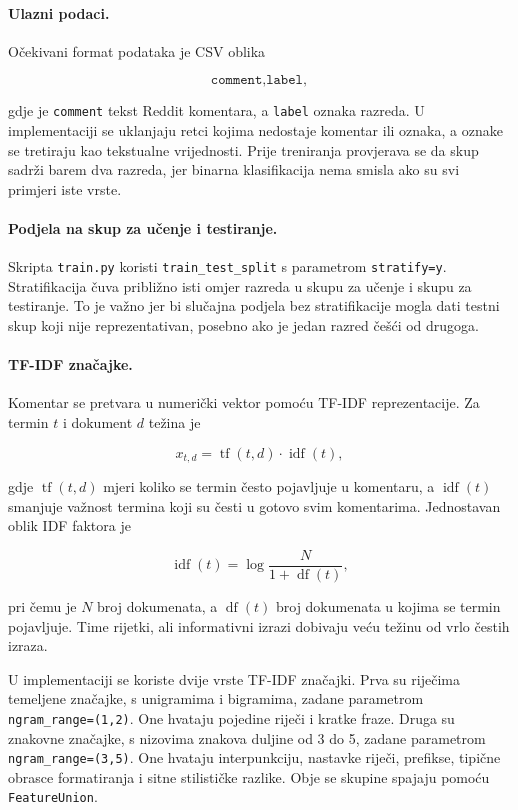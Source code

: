 \documentclass{article}
\begin{document}
\paragraph{Ulazni podaci.}
Očekivani format podataka je CSV oblika

\[
\texttt{comment,label},
\]

gdje je \texttt{comment} tekst Reddit komentara, a \texttt{label} oznaka razreda. U implementaciji se uklanjaju retci kojima nedostaje komentar ili oznaka, a oznake se tretiraju kao tekstualne vrijednosti. Prije treniranja provjerava se da skup sadrži barem dva razreda, jer binarna klasifikacija nema smisla ako su svi primjeri iste vrste.

\paragraph{Podjela na skup za učenje i testiranje.}
Skripta \texttt{train.py} koristi \texttt{train\_test\_split} s parametrom \texttt{stratify=y}. Stratifikacija čuva približno isti omjer razreda u skupu za učenje i skupu za testiranje. To je važno jer bi slučajna podjela bez stratifikacije mogla dati testni skup koji nije reprezentativan, posebno ako je jedan razred češći od drugoga.

\paragraph{TF-IDF značajke.}
Komentar se pretvara u numerički vektor pomoću TF-IDF reprezentacije. Za termin $t$ i dokument $d$ težina je

\[
x_{t,d}=\operatorname{tf}(t,d)\cdot \operatorname{idf}(t),
\]

gdje $\operatorname{tf}(t,d)$ mjeri koliko se termin često pojavljuje u komentaru, a $\operatorname{idf}(t)$ smanjuje važnost termina koji su česti u gotovo svim komentarima. Jednostavan oblik IDF faktora je

\[
\operatorname{idf}(t)=\log\frac{N}{1+\operatorname{df}(t)},
\]

pri čemu je $N$ broj dokumenata, a $\operatorname{df}(t)$ broj dokumenata u kojima se termin pojavljuje. Time rijetki, ali informativni izrazi dobivaju veću težinu od vrlo čestih izraza.

U implementaciji se koriste dvije vrste TF-IDF značajki. Prva su riječima temeljene značajke, s unigramima i bigramima, zadane parametrom \texttt{ngram\_range=(1,2)}. One hvataju pojedine riječi i kratke fraze. Druga su znakovne značajke, s nizovima znakova duljine od 3 do 5, zadane parametrom \texttt{ngram\_range=(3,5)}. One hvataju interpunkciju, nastavke riječi, prefikse, tipične obrasce formatiranja i sitne stilističke razlike. Obje se skupine spajaju pomoću \texttt{FeatureUnion}.
\end{document}
